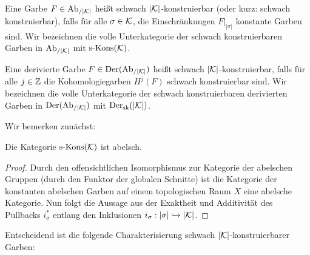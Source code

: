 \begin{defn}
  Eine Garbe $F \in \operatorname{Ab}_{/|\mathcal{K}|}$ heißt schwach $|\mathcal{K}|$-konstruierbar (oder
  kurz: schwach konstruierbar), falls für alle $\sigma \in \mathcal{K}$, die
  Einschränkungen $F|_{|\sigma|}$ konstante Garben sind. Wir
  bezeichnen die volle Unterkategorie der schwach konstruierbaren
  Garben in $\operatorname{Ab}_{/|\mathcal{K}|}$ mit $\operatorname{s-Kons}(\mathcal{K})$.

  Eine derivierte Garbe $F \in \operatorname{Der}(\operatorname{Ab}_{/|\mathcal{K}|})$ heißt schwach
  $|\mathcal{K}|$-konstruierbar, falls für alle $j \in \mathbb{Z}$ die
  Kohomologiegarben $H^j(F)$ schwach konstruierbar sind. Wir
  bezeichnen die volle Unterkategorie der schwach konstruierbaren
  derivierten Garben in $\operatorname{Der}(\operatorname{Ab}_{/|\mathcal{K}|})$ mit $\operatorname{Der}_{\mathrm{sk}}(|\mathcal{K}|)$.
\end{defn}

Wir bemerken zunächst:

\begin{lemma}[\cite{KS}, 8.1.3] \label{skons-abelian}
  Die Kategorie $\operatorname{s-Kons}(\mathcal{K})$ ist abelsch.
\end{lemma}
\begin{proof}
  Durch den offensichtlichen Isomorphismus zur Kategorie der abelschen
  Gruppen (durch den Funktor der globalen Schnitte) ist die Kategorie
  der konstanten abelschen Garben auf einem topologischen Raum $X$
  eine abelsche Kategorie. Nun folgt die Aussage aus der Exaktheit und
  Additivität des Pullbacks $i_{\sigma}^*$ entlang den Inklusionen
  $i_{\sigma}: |\sigma| \xhookrightarrow{} |\mathcal{K}|$.
\end{proof}

Entscheidend ist die folgende Charakterisierung schwach
$|\mathcal{K}|$-konstruierbarer Garben:

